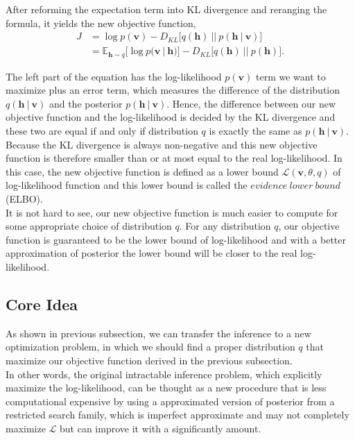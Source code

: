 \documentclass[conference]{IEEEtran}
\begin{document}
After reforming the expectation term into KL divergence and reranging the formula, it yields the new objective function,
\begin{equation}
  \begin{split}
	J &= \log p(\boldsymbol{v}) - D_{KL}\bigg[q(\boldsymbol{h})\ ||\ p(\boldsymbol{h}\ |\ \boldsymbol{v})\bigg]\\
  &=\mathbb{E}_{\boldsymbol{h}\sim q}\bigg[\log p(\boldsymbol{v}\ |\ \boldsymbol{h})\bigg]-D_{KL}\bigg[q(\boldsymbol{h})\ ||\ p(\boldsymbol{h})\bigg].
  \end{split}  
\end{equation}

The left part of the equation has the log-likelihood $p(\boldsymbol{v})$ term we want to maximize plus an error term, which measures the difference of the distribution $q(\boldsymbol{h}\ |\ \boldsymbol{v})$ and the posterior $p(\boldsymbol{h}\ |\ \boldsymbol{v})$. Hence, the difference between our new objective function and the log-likelihood is decided by the KL divergence and these two are equal if and only if distribution $q$ is exactly the same as $p(\boldsymbol{h}\ |\ \boldsymbol{v})$. Because the KL divergence is always non-negative and this new objective function is therefore smaller than or at most equal to the real log-likelihood. In this case, the new objective function is defined as a lower bound $\mathcal{L}(\boldsymbol{v}, \theta, q)$ of log-likelihood function and this lower bound is called the $evidence\ lower\ bound$ (ELBO).\\

It is not hard to see, our new objective function is much easier to compute for some appropriate choice of distribution $q$. For any distribution $q$, our objective function is guaranteed to be the lower bound of log-likelihood and with a better approximation of posterior the lower bound will be closer to the real log-likelihood.
\subsection{Core Idea}
As shown in previous subsection, we can transfer the inference to a new optimization problem, in which we should find a proper distribution $q$ that maximize our objective function derived in the previous subsection. \\

In other words, the original intractable inference problem, which explicitly maximize the log-likelihood, can be thought as a new procedure that is less computational expensive  by using a approximated version of posterior from a restricted search family, which is imperfect approximate and may not completely maximize $\mathcal{L}$ but can improve it with a significantly amount.\\
\end{document}
